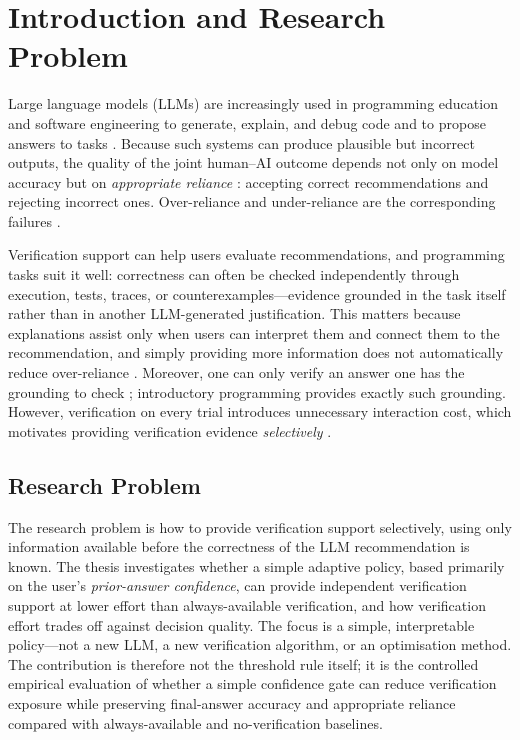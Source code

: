 \documentclass[oneside,final,14pt,a4paper]{extreport}
\begin{document}
\vspace{0.5em}
\endgroup

\section{Introduction and Research Problem}


Large language models (LLMs) are increasingly used in programming education
and software engineering to generate, explain, and debug code and to propose
answers to tasks \cite{Ma2024,Cambaz2024,Denny2024}. Because such systems can
produce plausible but incorrect outputs, the quality of the joint human--AI
outcome depends not only on model accuracy but on \emph{appropriate reliance}
\cite{LeeSee2004}: accepting correct recommendations and rejecting incorrect
ones. Over-reliance and under-reliance are the corresponding failures
\cite{PoursabziSangdeh2021,Vasconcelos2022}.


Verification support can help users evaluate recommendations, and programming
tasks suit it well: correctness can often be checked independently through
execution, tests, traces, or counterexamples---evidence grounded in the task
itself rather than in another LLM-generated justification. This matters
because explanations assist only when users can interpret them and connect
them to the recommendation, and simply providing more information does not
automatically reduce over-reliance
\cite{Bucinca2021,Vasconcelos2022,Bo2025,Schemmer2022}. Moreover, one can
only verify an answer one has the grounding to check \cite{Zhang2024Verify};
introductory programming provides exactly such grounding. However,
verification on every trial introduces unnecessary interaction cost, which
motivates providing verification evidence \emph{selectively}
\cite{CascadedLM2025}.


\subsection{Research Problem}

The research problem is how to provide verification support selectively, using
only information available before the correctness of the LLM recommendation is
known. The thesis investigates whether a simple adaptive policy, based
primarily on the user's \emph{prior-answer confidence}, can provide independent
verification support at lower effort than always-available verification, and
how verification effort trades off against decision quality. The focus is a
simple, interpretable policy---not a new LLM, a new verification algorithm, or
an optimisation method. The contribution is therefore not the threshold rule
itself; it is the controlled empirical evaluation of whether a simple
confidence gate can reduce verification exposure while preserving final-answer
accuracy and appropriate reliance compared with always-available and
no-verification baselines.
\end{document}
